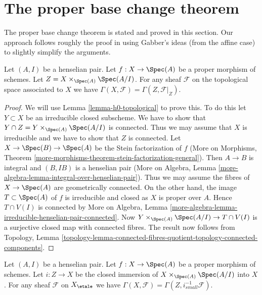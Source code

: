 \section{The proper base change theorem}
\label{section-proper-base-change}

\noindent
The proper base change theorem is stated and proved in this section.
Our approach follows roughly the proof in \cite[XII, Theorem 5.1]{SGA4}
using Gabber's ideas (from the affine case) to slightly simplify
the arguments.

\begin{lemma}
\label{lemma-zariski-h0-proper-over-henselian-pair}
Let $(A, I)$ be a henselian pair. Let $f : X \to \Spec(A)$ be a proper morphism
of schemes. Let $Z = X \times_{\Spec(A)} \Spec(A/I)$. For any
sheaf $\mathcal{F}$ on the topological space associated to $X$ we
have $\Gamma(X, \mathcal{F}) = \Gamma(Z, \mathcal{F}|_Z)$.
\end{lemma}

\begin{proof}
We will use Lemma \ref{lemma-h0-topological} to prove this. To do this
let $Y \subset X$ be an irreducible closed subscheme. We have to show
that $Y \cap Z = Y \times_{\Spec(A)} \Spec(A/I)$ is connected. Thus
we may assume that $X$ is irreducible and we have to show that $Z$
is connected. Let $X \to \Spec(B) \to \Spec(A)$ be the Stein factorization
of $f$ (More on Morphisms, Theorem
\ref{more-morphisms-theorem-stein-factorization-general}).
Then $A \to B$ is integral and $(B, IB)$ is a henselian pair
(More on Algebra, Lemma \ref{more-algebra-lemma-integral-over-henselian-pair}).
Thus we may assume the fibres of $X \to \Spec(A)$ are geometrically
connected. On the other hand, the image $T \subset \Spec(A)$ of $f$
is irreducible and closed as $X$ is proper over $A$. Hence $T \cap V(I)$
is connected by More on Algebra, Lemma
\ref{more-algebra-lemma-irreducible-henselian-pair-connected}.
Now $Y \times_{\Spec(A)} \Spec(A/I) \to T \cap V(I)$
is a surjective closed map with connected fibres.
The result now follows from Topology, Lemma
\ref{topology-lemma-connected-fibres-quotient-topology-connected-components}.
\end{proof}

\begin{lemma}
\label{lemma-h0-proper-over-henselian-pair}
Let $(A, I)$ be a henselian pair. Let $f : X \to \Spec(A)$ be a proper morphism
of schemes. Let $i : Z \to X$ be the closed immersion of
$X \times_{\Spec(A)} \Spec(A/I)$ into $X$. For any
sheaf $\mathcal{F}$ on $X_\etale$ we
have $\Gamma(X, \mathcal{F}) = \Gamma(Z, i_{small}^{-1}\mathcal{F})$.
\end{lemma}

